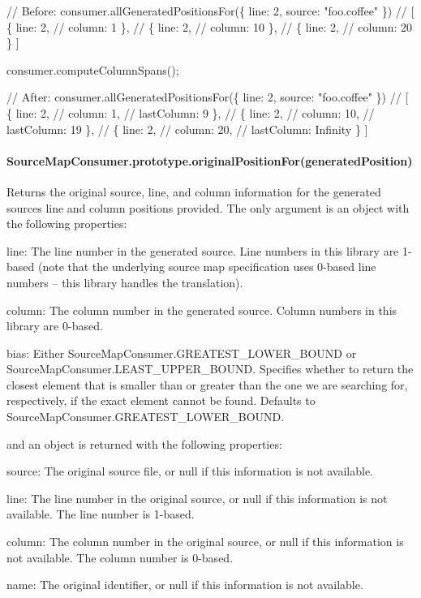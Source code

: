 \begin{DoxyCode}
// Before:
consumer.allGeneratedPositionsFor(\{ line: 2, source: "foo.coffee" \})
// [ \{ line: 2,
//     column: 1 \},
//   \{ line: 2,
//     column: 10 \},
//   \{ line: 2,
//     column: 20 \} ]

consumer.computeColumnSpans();

// After:
consumer.allGeneratedPositionsFor(\{ line: 2, source: "foo.coffee" \})
// [ \{ line: 2,
//     column: 1,
//     lastColumn: 9 \},
//   \{ line: 2,
//     column: 10,
//     lastColumn: 19 \},
//   \{ line: 2,
//     column: 20,
//     lastColumn: Infinity \} ]
\end{DoxyCode}


\paragraph*{Source\+Map\+Consumer.\+prototype.\+original\+Position\+For(generated\+Position)}

Returns the original source, line, and column information for the generated source\textquotesingle{}s line and column positions provided. The only argument is an object with the following properties\+:


\begin{DoxyItemize}
\item {\ttfamily line}\+: The line number in the generated source. Line numbers in this library are 1-\/based (note that the underlying source map specification uses 0-\/based line numbers -- this library handles the translation).
\item {\ttfamily column}\+: The column number in the generated source. Column numbers in this library are 0-\/based.
\item {\ttfamily bias}\+: Either {\ttfamily Source\+Map\+Consumer.\+G\+R\+E\+A\+T\+E\+S\+T\+\_\+\+L\+O\+W\+E\+R\+\_\+\+B\+O\+U\+ND} or {\ttfamily Source\+Map\+Consumer.\+L\+E\+A\+S\+T\+\_\+\+U\+P\+P\+E\+R\+\_\+\+B\+O\+U\+ND}. Specifies whether to return the closest element that is smaller than or greater than the one we are searching for, respectively, if the exact element cannot be found. Defaults to {\ttfamily Source\+Map\+Consumer.\+G\+R\+E\+A\+T\+E\+S\+T\+\_\+\+L\+O\+W\+E\+R\+\_\+\+B\+O\+U\+ND}.
\end{DoxyItemize}

and an object is returned with the following properties\+:


\begin{DoxyItemize}
\item {\ttfamily source}\+: The original source file, or null if this information is not available.
\item {\ttfamily line}\+: The line number in the original source, or null if this information is not available. The line number is 1-\/based.
\item {\ttfamily column}\+: The column number in the original source, or null if this information is not available. The column number is 0-\/based.
\item {\ttfamily name}\+: The original identifier, or null if this information is not available.
\end{DoxyItemize}


